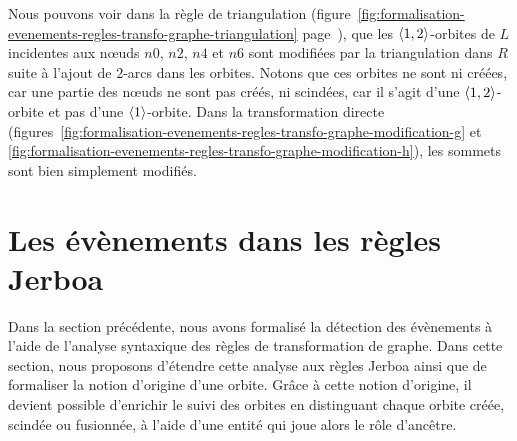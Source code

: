 Nous pouvons voir dans la règle de triangulation
(figure~\ref{fig:formalisation-evenements-regles-transfo-graphe-triangulation}
page~\pageref{fig:formalisation-evenements-regles-transfo-graphe-triangulation}),
que les \(\langle1,2\rangle\)-orbites de \(L\) incidentes aux n\oe uds \(n0\), \(n2\),
\(n4\) et \(n6\) sont modifiées par la triangulation dans \(R\) suite à l'ajout
de \(2\)-arcs dans les orbites. %
Notons que ces orbites ne sont ni créées, car une partie des n\oe uds ne sont
pas créés, ni scindées, car il s'agit d'une \(\langle1,2\rangle\)-orbite et pas d'une
\(\langle1\rangle\)-orbite. %
Dans la transformation directe
(figures~\ref{fig:formalisation-evenements-regles-transfo-graphe-modification-g} et \ref{fig:formalisation-evenements-regles-transfo-graphe-modification-h}), les sommets sont bien simplement modifiés. %




\section{Les évènements dans les règles Jerboa }
\label{sec:formalisation-evenements-regles-jerboa}

Dans la section précédente, nous avons formalisé la détection des évènements à
l'aide de l'analyse syntaxique des règles de transformation de graphe. %
Dans cette section, nous proposons d'étendre cette analyse aux règles Jerboa
ainsi que de formaliser la notion d'origine d'une orbite. %
Grâce à cette notion d'origine, il devient possible d'enrichir le suivi des orbites en distinguant chaque orbite créée, scindée ou fusionnée, à l'aide d'une entité qui joue alors le rôle d'ancêtre.

